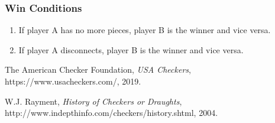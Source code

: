 \documentclass[10pt]{article}
\begin{document}
\subsubsection{Win Conditions}

\begin{enumerate}
    \item If player A has no more pieces, player B is the winner and vice versa.
    \item If player A disconnects, player B is the winner and vice versa.
\end{enumerate}


\begin{thebibliography}{9}

  The American Checker Foundation,
  \textit{USA Checkers},
  https://www.usacheckers.com/,
  2019.

W.J. Rayment,
\textit{History of Checkers or Draughts},
http://www.indepthinfo.com/checkers/history.shtml,
2004.

\end{thebibliography}
\end{document}
